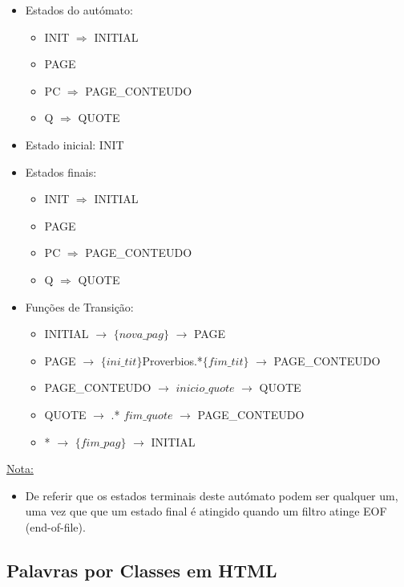 \documentclass[11pt,a4paper]{report}
\begin{document}
\begin{itemize}
	\item Estados do autómato:
		\begin{itemize}
			\item INIT $\Rightarrow$ INITIAL
			\item PAGE
			\item PC $\Rightarrow$ PAGE\_CONTEUDO
			\item Q $\Rightarrow$ QUOTE
		\end{itemize}
	\item Estado inicial: INIT
	\item Estados finais:
		\begin{itemize}
			\item INIT $\Rightarrow$ INITIAL
			\item PAGE
			\item PC $\Rightarrow$ PAGE\_CONTEUDO
			\item Q $\Rightarrow$ QUOTE
		\end{itemize}
	\item Funções de Transição:
		\begin{itemize}
			\item INITIAL $\rightarrow$ $\{nova\_pag\}$ $\rightarrow$ PAGE
			\item PAGE $\rightarrow$ $\{ini\_tit\}$Proverbios.*$\{fim\_tit\}$ $\rightarrow$ PAGE\_CONTEUDO
			\item PAGE\_CONTEUDO $\rightarrow$ $inicio\_quote$ $\rightarrow$ QUOTE
			\item QUOTE $\rightarrow$ .* $fim\_quote$ $\rightarrow$ PAGE\_CONTEUDO
			\item * $\rightarrow$ $\{fim\_pag\}$ $\rightarrow$ INITIAL
		\end{itemize}
\end{itemize}

\vspace{0.5cm}

\underline{Nota:}
\begin{itemize}
	\item De referir que os estados terminais deste autómato podem ser qualquer um, uma vez que que um estado final é atingido quando um filtro atinge EOF (end-of-file).
\end{itemize}



\newpage

\subsection{Palavras por Classes em HTML}
\label{sub:algoritmos3}
\end{document}

